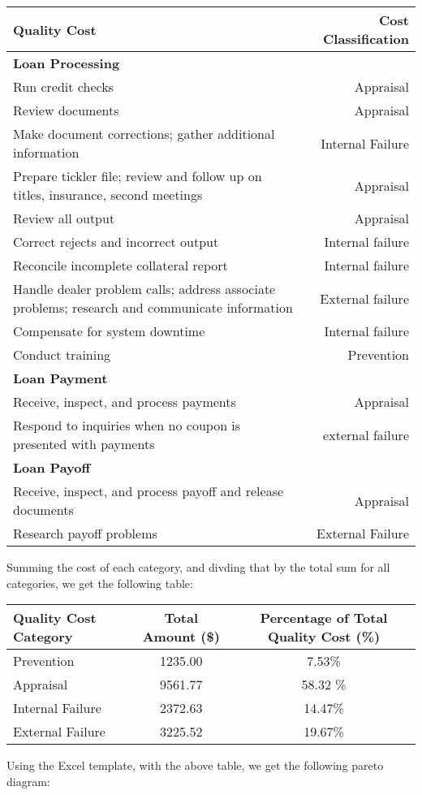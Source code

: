 \documentclass[letterpaper, 11pt]{article}
\newcommand{\1}{\mathds{1}}	%
\theoremstyle{definition}
\begin{document}
\begin{table}[H]
\centering
\begin{tabular}{@{}p{10cm}r@{}}
\toprule
\textbf{Quality Cost} & \textbf{Cost Classification} \\ \midrule
\multicolumn{2}{l}{\textbf{Loan Processing}} \\ \midrule
Run credit checks & Appraisal \\
Review documents & Appraisal \\
Make document corrections; gather additional information & Internal Failure\\
Prepare tickler file; review and follow up on titles, 
insurance, second meetings & Appraisal\\
Review all output & Appraisal\\
Correct rejects and incorrect output & Internal failure\\
Reconcile incomplete collateral report & Internal failure \\
Handle dealer problem calls; address associate problems; 
research and communicate information & External failure\\
Compensate for system downtime & Internal failure\\
Conduct training & Prevention\\ \midrule
\multicolumn{2}{l}{\textbf{Loan Payment}} \\ \midrule
Receive, inspect, and process payments & Appraisal\\
Respond to inquiries when no coupon is presented with payments & external failure\\ \midrule
\multicolumn{2}{l}{\textbf{Loan Payoff}} \\ \midrule
Receive, inspect, and process payoff and release documents & Appraisal \\
Research payoff problems & External Failure\\ \bottomrule
\end{tabular}
\end{table}
\noindent
    Summing the cost of each category, and divding that by the total sum for all categories, we get the following table:
\begin{table}[H]
\centering
\begin{tabular}{lcc}
\toprule
\textbf{Quality Cost Category} & \textbf{Total Amount (\$)} & \textbf{Percentage of Total Quality Cost (\%)} \\
\midrule
Prevention                    & 1235.00                  & 7.53\%                                              \\
Appraisal                     & 9561.77                  &  58.32 \%                                            \\
Internal Failure              & 2372.63                  & 14.47\%                                              \\
External Failure              & 3225.52                  &  19.67\%                                            \\
\bottomrule
\end{tabular}
\end{table}
Using the Excel template, with the above table, we get the following pareto diagram:
\end{document}

